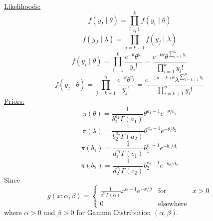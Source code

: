 \documentclass[lecture,12pt,]{pcms-l}
\numberwithin{section}{chapter}
\numberwithin{equation}{chapter}
\theoremstyle{plain}
\theoremstyle{definition}
\theoremstyle{definition}
\begin{document}
\underline{Likelihoods:}
\begin{equation*}
f(y_{I}\mid \theta)= \prod_{i=1}^{k}f(y_i \mid \theta)
\end{equation*}
\begin{equation*}
f(y_{J}\mid \lambda)= \prod_{j=k+1}^{n}f(y_j \mid \lambda)
\end{equation*}
\begin{equation*}
f(y_i \mid \theta)=\prod_{i=1}^{k}\frac{e^{-\theta} \theta^{y_i}}{y_i !}=\frac{e^{-k\theta} \theta^{\sum_{i=1}^k y_i}}{\prod_{i=1}^{k}y_i !}
\end{equation*}
\begin{equation*}
f(y_j \mid \theta)=\prod_{j=k+1}^{n}\frac{e^{-\theta} \theta^{y_j}}{y_j !}=\frac{e^{-(n-k)\theta} \lambda^{\sum_{i=k+1}^n y_i}}{\prod_{i=k+1}^{n}y_i !}
\end{equation*}
\underline{Priors:}
\begin{equation*}
\pi(\theta)=\frac{1}{b_{1}^{a_1} \Gamma(a_1)}\theta^{a_1 -1}e^{-\theta/b_1}
\end{equation*}
\begin{equation*}
\pi(\lambda)=\frac{1}{b_{2}^{a_2} \Gamma(a_2)}\theta^{a_2 -1}e^{-\theta/b_2}
\end{equation*}
\begin{equation*}
\pi(b_1)=\frac{1}{d_{1}^{c_1} \Gamma(c_1)}b_{1}^{c_1 -1}e^{-b_1/d_1}
\end{equation*}
\begin{equation*}
\pi(b_2)=\frac{1}{d_{2}^{c_2} \Gamma(c_2)}b_{2}^{c_2 -1}e^{-b_2/d_2}
\end{equation*}
Since 
\begin{equation*}
g(x;\alpha ,\beta )= 
\left\{\begin{matrix}
\frac{1}{\beta^{\alpha} \Gamma(\alpha)}x^{\alpha -1}e^{-x/\beta} & \text{for} & x>0\\ 
0 & \text{elsewhere} & 
\end{matrix}\right.
\end{equation*}
where $\alpha > 0$ and $\beta > 0$ for Gamma Distribution $(\alpha,\beta)$.
\end{document}
